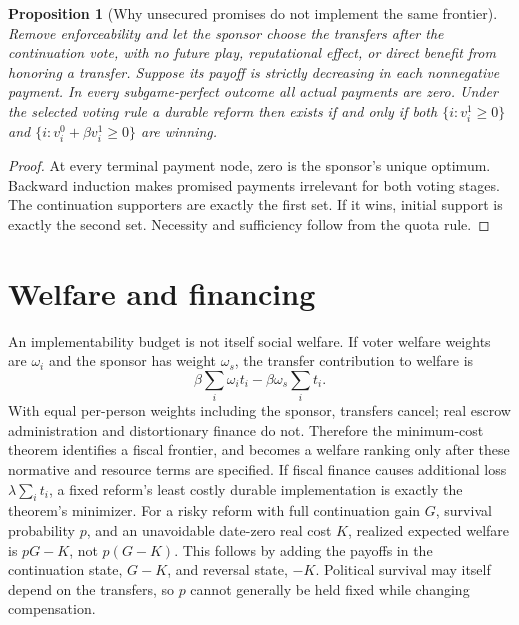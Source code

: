\documentclass[11pt]{article}
\newtheorem{proposition}{Proposition}
\theoremstyle{definition}
\begin{document}
\begin{proposition}[Why unsecured promises do not implement the same frontier]
Remove enforceability and let the sponsor choose the transfers after the continuation vote, with no future play, reputational effect, or direct benefit from honoring a transfer. Suppose its payoff is strictly decreasing in each nonnegative payment. In every subgame-perfect outcome all actual payments are zero. Under the selected voting rule a durable reform then exists if and only if both $\{i:v_i^1\geq0\}$ and $\{i:v_i^0+\beta v_i^1\geq0\}$ are winning.
\end{proposition}
\begin{proof}
At every terminal payment node, zero is the sponsor's unique optimum. Backward induction makes promised payments irrelevant for both voting stages. The continuation supporters are exactly the first set. If it wins, initial support is exactly the second set. Necessity and sufficiency follow from the quota rule.
\end{proof}

\section*{Welfare and financing}
An implementability budget is not itself social welfare. If voter welfare weights are $\omega_i$ and the sponsor has weight $\omega_s$, the transfer contribution to welfare is
\[
 \beta\sum_i\omega_i t_i-\beta\omega_s\sum_i t_i.
\]
With equal per-person weights including the sponsor, transfers cancel; real escrow administration and distortionary finance do not. Therefore the minimum-cost theorem identifies a fiscal frontier, and becomes a welfare ranking only after these normative and resource terms are specified. If fiscal finance causes additional loss $\lambda\sum_i t_i$, a fixed reform's least costly durable implementation is exactly the theorem's minimizer.
For a risky reform with full continuation gain $G$, survival probability $p$, and an unavoidable date-zero real cost $K$, realized expected welfare is $pG-K$, not $p(G-K)$. This follows by adding the payoffs in the continuation state, $G-K$, and reversal state, $-K$. Political survival may itself depend on the transfers, so $p$ cannot generally be held fixed while changing compensation.
\end{document}
